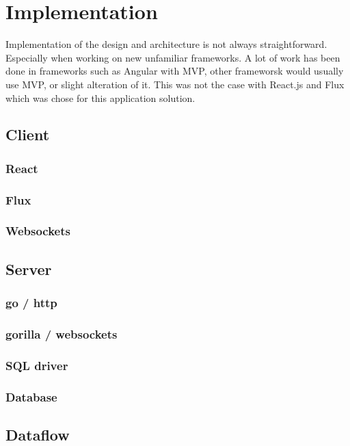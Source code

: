 \chapter{Implementation}
Implementation of the design and architecture is not always straightforward. Especially when working on new unfamiliar frameworks. A lot of work has been done in frameworks such as Angular with MVP, other frameworsk would usually use MVP, or slight alteration of it. This was not the case with React.js and Flux which was chose for this application solution.

\section{Client}
\subsection{React}
\subsection{Flux}
\subsection{Websockets}

\section{Server}
\subsection{go / http}
\subsection{gorilla / websockets}
\subsection{SQL driver}
\subsection{Database}

\section{Dataflow}
